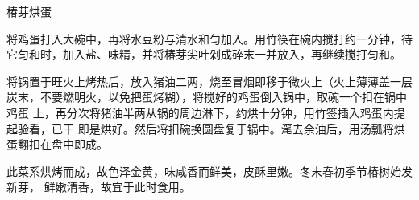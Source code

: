 %
%
%
%
%
%
%
\begin{recipe}{椿芽烘蛋}

\ingredients


\preparation

\step 将鸡蛋打入大碗中，再将水豆粉与清水和匀加入。用竹筷在碗内搅打约一分钟，待
它匀和时，加入盐、味精，并将椿芽尖叶剁成碎末一并放入，再继续搅打匀和。

\step 将锅置于旺火上烤热后，放入猪油二两，烧至冒烟即移于微火上（火上薄薄盖一层
炭末，不要燃明火，以免把蛋烤糊），将搅好的鸡蛋倒入锅中，取碗一个扣在锅中鸡蛋
上，再分次将猪油半两从锅的周边淋下，约烘十分钟，用竹签插入鸡蛋内提起验看，已干
即是烘好。然后将扣碗换圆盘复于锅中。滗去余油后，用汤瓢将烘蛋翻扣在盘中即成。

\features

此菜系烘烤而成，故色泽金黄，味咸香而鲜美，皮酥里嫩。冬末春初季节椿树始发新芽，
鲜嫩清香，故宜于此时食用。

\end{recipe}

